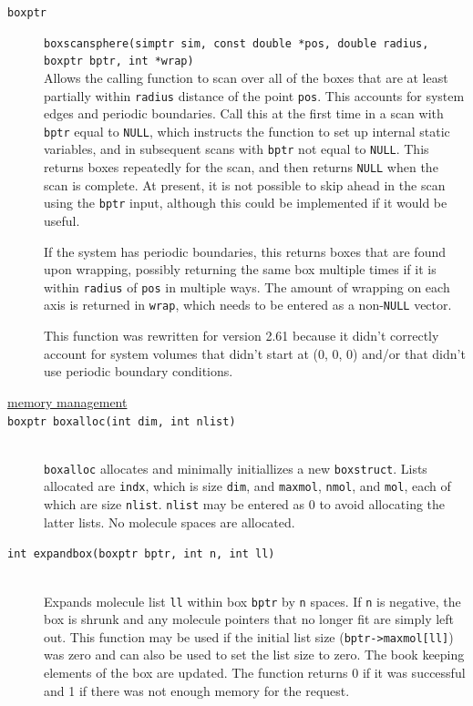 \documentclass {scrbook}
\newcommand {\ttt} {\texttt}
\begin{document}
\begin{description}
\item[\ttt{boxptr}]
\ttt{boxscansphere(simptr sim, const double *pos, double radius, boxptr bptr, int *wrap)}
\hfill \\
Allows the calling function to scan over all of the boxes that are at least partially within \ttt{radius} distance of the point \ttt{pos}. This accounts for system edges and periodic boundaries. Call this at the first time in a scan with \ttt{bptr} equal to \ttt{NULL}, which instructs the function to set up internal static variables, and in subsequent scans with \ttt{bptr} not equal to \ttt{NULL}. This returns boxes repeatedly for the scan, and then returns \ttt{NULL} when the scan is complete. At present, it is not possible to skip ahead in the scan using the \ttt{bptr} input, although this could be implemented if it would be useful.

If the system has periodic boundaries, this returns boxes that are found upon wrapping, possibly returning the same box multiple times if it is within \ttt{radius} of \ttt{pos} in multiple ways. The amount of wrapping on each axis is returned in \ttt{wrap}, which needs to be entered as a non-\ttt{NULL} vector.

This function was rewritten for version 2.61 because it didn't correctly account for system volumes that didn't start at (0, 0, 0) and/or that didn't use periodic boundary conditions.

\item[\underline{memory management}]

\item[\ttt{boxptr boxalloc(int dim, int nlist)}]
\hfill \\
\ttt{boxalloc} allocates and minimally initiallizes a new \ttt{boxstruct}. Lists allocated are \ttt{indx}, which is size \ttt{dim}, and \ttt{maxmol}, \ttt{nmol}, and \ttt{mol}, each of which are size \ttt{nlist}. \ttt{nlist} may be entered as 0 to avoid allocating the latter lists. No molecule spaces are allocated.

\item[\ttt{int expandbox(boxptr bptr, int n, int ll)}]
\hfill \\
Expands molecule list \ttt{ll} within box \ttt{bptr} by \ttt{n} spaces. If \ttt{n} is negative, the box is shrunk and any molecule pointers that no longer fit are simply left out. This function may be used if the initial list size (\ttt{bptr->maxmol[ll]}) was zero and can also be used to set the list size to zero. The book keeping elements of the box are updated. The function returns 0 if it was successful and 1 if there was not enough memory for the request.


\end{description}
\end{document}
